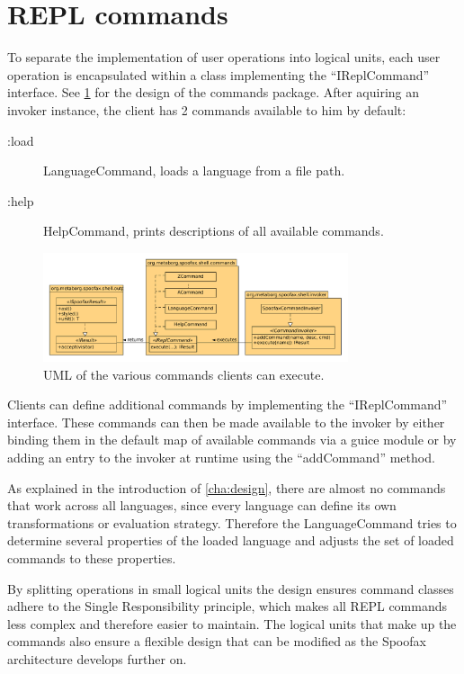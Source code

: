 \section{REPL commands}
\label{sec:commands}

To separate the implementation of user operations into logical units, each user
operation is encapsulated within a class implementing the ``IReplCommand''
interface. See \cref{fig:uml-commands} for the design of the commands package.
After aquiring an invoker instance, the client has 2 commands available to him
by default:

\begin{description}
  \item [:load] LanguageCommand, loads a language from a file path.
  \item [:help] HelpCommand, prints descriptions of all available commands.
\end{description}

\begin{figure}[h]
  \centering
  \includegraphics[width=0.8\textwidth]{uml-commands}
  \caption{UML of the various commands clients can execute.}
  \label{fig:uml-commands}
\end{figure}

Clients can define additional commands by implementing the ``IReplCommand''
interface. These commands can then be made available to the invoker by either
binding them in the default map of available commands via a guice module or by
adding an entry to the invoker at runtime using the ``addCommand'' method.

As explained in the introduction of \cref{cha:design}, there are almost no
commands that work across all languages, since every language can define its
own transformations or evaluation strategy. Therefore the LanguageCommand tries
to determine several properties of the loaded language and adjusts the set of
loaded commands to these properties.

By splitting operations in small logical units the design ensures command
classes adhere to the Single Responsibility principle, which makes all REPL
commands less complex and therefore easier to maintain. The logical units that
make up the commands also ensure a flexible design that can be modified
as the Spoofax architecture develops further on.

